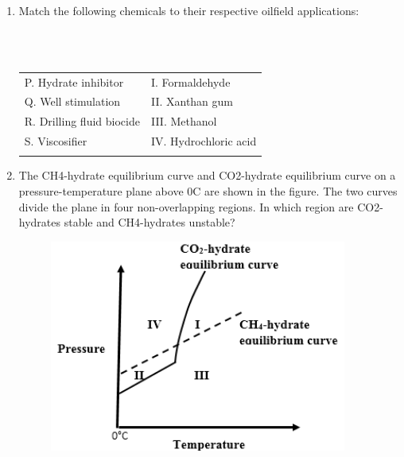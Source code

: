 \documentclass[journal,12pt,onecolumn]{IEEEtran}
\theoremstyle{remark}
\begin{document}
\begin{enumerate}
\item Match the following chemicals to their respective oilfield applications:

\hfill{}\\\\

\begin{tabular}{ll}
P. Hydrate inhibitor & I. Formaldehyde\\
Q. Well stimulation & II. Xanthan gum\\
R. Drilling fluid biocide & III. Methanol\\
S. Viscosifier & IV. Hydrochloric acid\\\\
\end{tabular}

\begin{enumerate}
\end{enumerate}

\pagebreak

\item The CH4-hydrate equilibrium curve  and CO2-hydrate equilibrium curve  on a pressure-temperature plane above 0{\degree}C are shown in the figure. The two curves divide the plane in four non-overlapping regions. In which region are CO2-hydrates stable and CH4-hydrates unstable?

\hfill{}

\begin{figure}[h!]
  \centering
  \includegraphics[width=0.5\columnwidth]{figs/pic3.png} 
   \caption*{}
  \label{fig:Q17}
\end{figure}


\end{enumerate}
\end{document}
